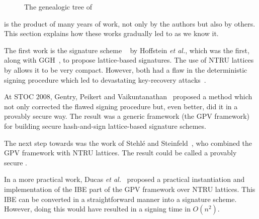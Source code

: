 \begin{figure}[H]
\centering
{}
\caption{The genealogic tree of \falcon}\label{fig:genealogictree}
\end{figure}

\falcon is the product of many years of work, not only by the authors but also by others. This section explains how these works gradually led to \falcon as we know it.

The first work is the signature scheme \ntrusign~\cite{RSA:HHPSW03} by Hoffstein \textit{et al.}, which was the first, along with GGH~\cite{C:GolGolHal97b}, to propose lattice-based signatures. The use of NTRU lattices by \ntrusign allows it to be very compact. However, both had a flaw in the deterministic signing procedure which led to devastating key-recovery attacks~\cite{EC:NguReg06,AC:DucNgu12b}.

At STOC 2008, Gentry, Peikert and Vaikuntanathan~\cite{STOC:GenPeiVai08} proposed a method which not only corrected the flawed signing procedure but, even better, did it in a provably secure way. The result was a generic framework (the GPV framework) for building secure hash-and-sign lattice-based signature schemes.

The next step towards \falcon was the work of Stehl\'e and Steinfeld~\cite{EC:SteSte11}, who combined the GPV framework with NTRU lattices. The result could be called a provably secure \ntrusign.

In a more practical work, Ducas \textit{et al.}~\cite{AC:DucLyuPre14} proposed a practical instantiation and implementation of the IBE part of the GPV framework over NTRU lattices. This IBE
can be converted in a straightforward manner into a signature scheme. However, doing this would have resulted in a signing time in $O(n^2)$.

